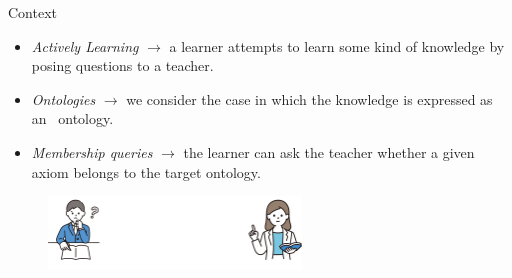 \documentclass[presentation]{beamer}\mode<presentation>{\usetheme{blackAMSBolognaFC}}
\begin{document}
\begin{frame}[c]{Context}
    

    \begin{itemize}
        \item \emph{Actively Learning} $\rightarrow$ a learner attempts to learn some kind of knowledge by posing questions to a teacher.
        \vspace{0.1cm}
        \item \emph{Ontologies} $\rightarrow$ we consider the case in which the knowledge is expressed as an \EL~ontology.
        \vspace{0.1cm}
        \item \emph{Membership queries} $\rightarrow$ the learner can ask the teacher whether a given axiom belongs to the target ontology.
    \end{itemize}
    \vfill
    \begin{figure}
        \includegraphics[width=0.6\textwidth]{figures/membership_queries_examples}
        \hspace{3cm}
    \end{figure}

\end{frame}
\end{document}
